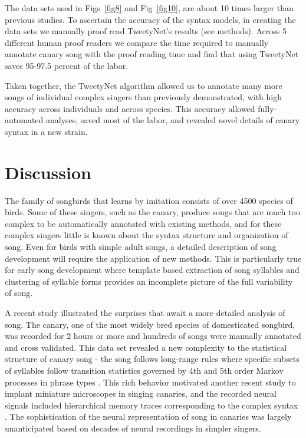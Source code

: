 \documentclass[10pt,letterpaper]{article}
\begin{document}
The data sets used in Figs~\ref{fig8} and Fig~\ref{fig10}, are about 10 times larger than previous studies. To ascertain the accuracy of the syntax models, in creating the data sets we manually proof read TweetyNet's results (see methods). Across 5 different human proof readers we compare the time required to manually annotate canary song with the proof reading time and find that using TweetyNet saves 95-97.5 percent of the labor.
\newline

Taken together, the TweetyNet algorithm allowed us to annotate many more songs of individual complex singers than previously demonstrated, with high accuracy across individuals and across species. This accuracy allowed fully-automated analyses, saved most of the labor, and revealed novel details of canary syntax in a new strain.    

\section*{Discussion}
\label{Discussion}
The family of songbirds that learns by imitation consists of over 4500 species of birds. Some of these singers, such as the canary, produce songs that are much too complex to be automatically annotated with existing methods, and for these complex singers little is known about the syntax structure and organization of song. Even for birds with simple adult songs, a detailed description of song development will require the application of new methods. This is particularly true for early song development where template based extraction of song syllables and clustering of syllable forms provides an incomplete picture of the full variability of song. 

A recent study illustrated the surprises that await a more detailed analysis of song. The canary, one of the most widely bred species of domesticated songbird, was recorded for 2 hours or more and hundreds of songs were manually annotated and cross validated. This data set revealed a new complexity to the statistical structure of canary song - the song follows long-range rules where specific subsets of syllables follow transition statistics governed by 4th and 5th order Markov processes in phrase types \cite{markowitz_long-range_2013}. This rich behavior motivated another recent study to implant miniature microscopes in singing canaries, and the recorded neural signals included hierarchical memory traces corresponding to the complex syntax \cite{cohen_hidden_2020}. The sophistication of the neural representation of song in canaries was largely unanticipated based on decades of neural recordings in simpler singers.
\end{document}

